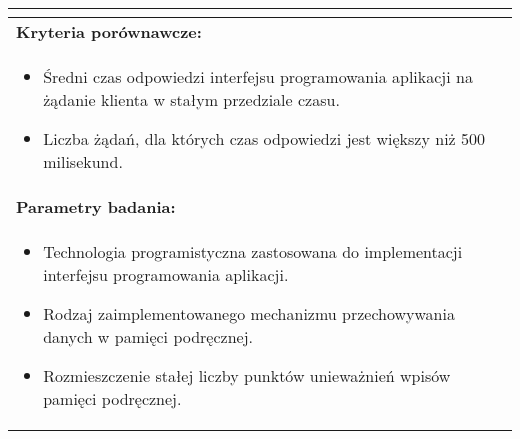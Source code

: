 \begin{longtable}[c]{|llll|}
{\begin{itemize}[label={}]
          \end{itemize}
    }                                                           \\ \hline
    \multicolumn{4}{|l|}{\textbf{Kryteria porównawcze:}}                             \\ \hline
    \multicolumn{4}{|p{\linewidth}|}{
        \begin{itemize}
            \item Średni czas odpowiedzi interfejsu programowania aplikacji na żądanie klienta w stałym przedziale czasu.
            \item Liczba żądań, dla których czas odpowiedzi jest większy niż 500 milisekund.
        \end{itemize}
    }                                                           \\ \hline
    \multicolumn{4}{|l|}{\textbf{Parametry badania:}}                                \\ \hline
    \multicolumn{4}{|p{\linewidth}|}{
        \begin{itemize}
            \item Technologia programistyczna zastosowana do implementacji interfejsu programowania aplikacji.
            \item Rodzaj zaimplementowanego mechanizmu przechowywania danych w pamięci podręcznej.
            \item Rozmieszczenie stałej liczby punktów unieważnień wpisów pamięci podręcznej.
        \end{itemize}
    }                                                           \\ \hline
\end{longtable}

